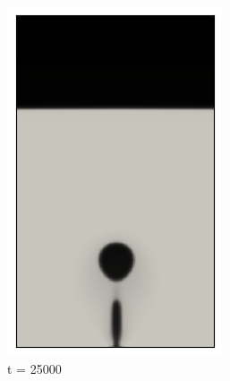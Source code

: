\begin{figure}[H]
	\medskip
	\begin{subfigure}{0.25\textwidth}
		\includegraphics[width=\linewidth]{figs/cap4/cuda_bb_760_d25}
		\caption{t = 25000}
		\label{fig:4}
	\end{subfigure}\hfil  
	\begin{subfigure}{0.25\textwidth}

\end{subfigure}
\end{figure}
